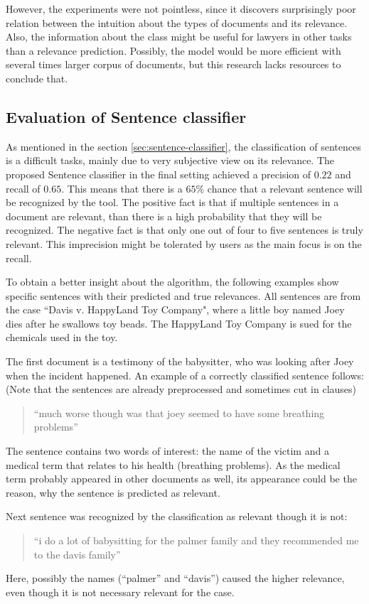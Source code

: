 \documentclass[
  digital, %
  notable,   %
  nolof,     %
  nolot,     %
]{fithesis3}
\begin{document}
However, the experiments were not pointless, since it discovers surprisingly poor relation between the intuition about the types of documents and its relevance.
Also, the information about the class might be useful for lawyers in other tasks than a relevance prediction.
Possibly, the model would be more efficient with several times larger corpus of documents, but this research lacks resources to conclude that.

\subsection{Evaluation of Sentence classifier}
As mentioned in the section \ref{sec:sentence-classifier}, the classification of sentences is a difficult tasks, mainly due to very subjective view on its relevance.
The proposed Sentence classifier in the final setting achieved a precision of $0.22$ and recall of $0.65$.
This means that there is a $65\%$ chance that a relevant sentence will be recognized by the tool.
The positive fact is that if multiple sentences in a document are relevant, than there is a high probability that they will be recognized.
The negative fact is that only one out of four to five sentences is truly relevant.
This imprecision might be tolerated by users as the main focus is on the recall.

To obtain a better insight about the algorithm, the following examples show specific sentences with their predicted and true relevances.
All sentences are from the case ``Davis v. HappyLand Toy Company", where a little boy named Joey dies after he swallows toy beads.
The HappyLand Toy Company is sued for the chemicals used in the toy.

The first document is a testimony of the babysitter, who was looking after Joey when the incident happened.
An example of a correctly classified sentence follows:
(Note that the sentences are already preprocessed and sometimes cut in clauses)
\begin{quote}
``much worse though was that joey seemed to have some breathing problems''
\end{quote}
The sentence contains two words of interest: the name of the victim and a medical term that relates to his health (breathing problems).
As the medical term probably appeared in other documents as well, its appearance could be the reason, why the sentence is predicted as relevant.

Next sentence was recognized by the classification as relevant though it is not:
\begin{quote}
``i do a lot of babysitting for the palmer family and they recommended me to the davis family''
\end{quote}
Here, possibly the names (``palmer'' and ``davis'') caused the higher relevance, even though it is not necessary relevant for the case.
\end{document}
